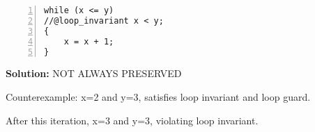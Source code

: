 \begin{lstlisting}[numbers=left]
while (x <= y)
//@loop_invariant x < y;
{
    x = x + 1;
}
\end{lstlisting}
\begin{framed}\textbf{Solution:}
NOT ALWAYS PRESERVED

Counterexample: x=2 and y=3, satisfies loop invariant and loop guard.

After this iteration, x=3 and y=3, violating loop invariant.
\end{framed}